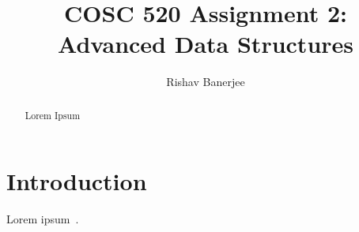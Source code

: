 \documentclass[acmsmall,screen, nonacm]{acmart}
\begin{document}
\title{COSC 520 Assignment 2: Advanced Data Structures}

\author{Rishav Banerjee}

\renewcommand{\shortauthors}{Banerjee}

\begin{abstract}
	Lorem Ipsum
\end{abstract}

\received{\today}

\maketitle

\section{Introduction}

Lorem ipsum~\cite{fan2014Cuckoo}.



\end{document}
